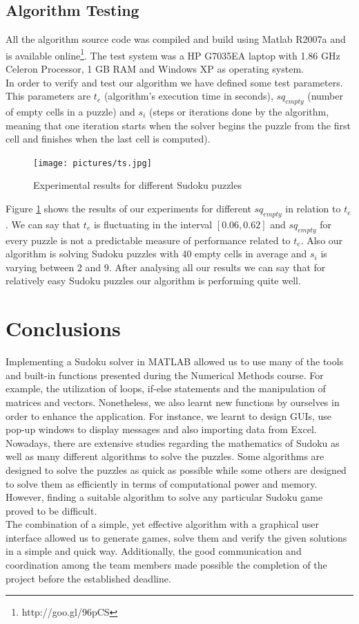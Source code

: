 \documentclass[12pt,a4paper]{article} %
\begin{document}
\subsection{Algorithm Testing}
All the algorithm source code was compiled and build using Matlab R2007a and is available online\footnote{http://goo.gl/96pCS}. The test system was a HP G7035EA laptop with 1.86 GHz Celeron Processor, 1 GB RAM and Windows XP as operating system.
\newline
\\ In order to verify and test our algorithm we have defined some test parameters. This parameters are $t_e$ (algorithm's execution time in seconds), $sq_{empty}$ (number of empty cells in a puzzle) and $s_i$ (steps or iterations done by the algorithm, meaning that one iteration starts when the solver begins the puzzle from the first cell and finishes when the last cell is computed). 
\begin{figure}[h!]
\centering
\texttt{[image: pictures/ts.jpg]}
\caption{Experimental results for different Sudoku puzzles}
\label{fig:ts}
\end{figure}
Figure \ref{fig:ts} shows the results of our experiments for different $sq_{empty}$ in relation to $t_e$. We can say that $t_e$ is fluctuating in the interval $[0.06, 0.62]$ and $sq_{empty}$ for every puzzle is not a predictable measure of performance related to $t_e$. Also our algorithm is solving Sudoku puzzles with 40 empty cells in average and $s_i$ is varying between 2 and 9. After analysing all our results we can say that for relatively easy Sudoku puzzles our algorithm is performing quite well. 
\section{Conclusions}
Implementing a Sudoku solver in MATLAB allowed us to use many of the tools and built-in functions presented during the Numerical Methods course. For example, the utilization of loops, if-else statements and the manipulation of matrices and vectors. Nonetheless, we also learnt new functions by ourselves in order to enhance the application. For instance, we learnt to design GUIs, use pop-up windows to display messages and also importing data from Excel.
\newline
\\Nowadays, there are extensive studies regarding the mathematics of Sudoku as well as many different algorithms to solve the puzzles. Some algorithms are designed to solve the puzzles as quick as possible while some others are designed to solve them as efficiently in terms of computational power and memory. However, finding a suitable algorithm to solve any particular Sudoku game proved to be difficult.
\newline
\\The combination of a simple, yet effective algorithm with a graphical user interface allowed us to generate games, solve them and verify the given solutions in a simple and quick way. Additionally, the good communication and coordination among the team members made possible the completion of the project before the established deadline.

{}

\end{document}
